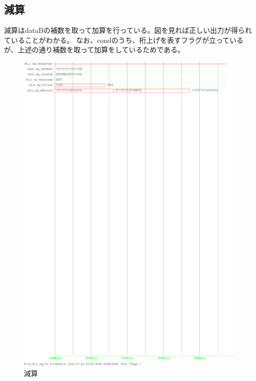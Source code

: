\documentclass{jsarticle}
\begin{document}
\subsection{減算}
減算はdataBの補数を取って加算を行っている。図を見れば正しい出力が得られていることがわかる。
なお、condのうち、桁上げを表すフラグが立っているが、上述の通り補数を取って加算をしているためである。
\begin{figure}
    \caption{減算}
  \includegraphics[scale=0.8]{ALU_subst.ps}
\end{figure}
\end{document}
